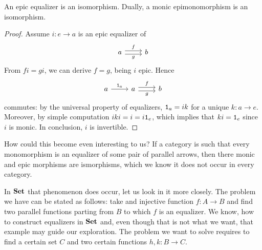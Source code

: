 \begin{proposition}\label{proposition:EpicEqualizersAreIsomorphisms}
An epic equalizer is an isomorphism. Dually, a monic epimonomorphism is an isomorphism.
\end{proposition}

\begin{proof}
Assume \(i : e \to a\) is an epic equalizer of
\[\begin{tikzcd} a \ar["f", r, shift left] \ar["g", r, shift right, swap] & b \end{tikzcd}\] From \(fi = gi\), we can derive \(f = g\), being \(i\) epic. Hence
\[\begin{tikzcd} a \ar["{\id_a}", r] & a \ar["f", r, shift left] \ar["g", r, shift right, swap] & b \end{tikzcd}\]
commutes: by the universal property of equalizers, \(\mathtt 1_a = ik\) for a unique \(k : a \to e\). Moreover, by simple computation \(iki = i = i \mathtt 1_e\), which implies that \(ki = \mathtt 1_e\) since \(i\) is monic. In conclusion, \(i\) is invertible.
\end{proof}

How could this become even interesting to us? If a category is such that every monomorphism is an equalizer of some pair of parallel arrows, then there monic and epic morphisms are ismorphisms, which we know it does not occur in every category.

\begin{example}
In \(\mathbf{Set}\) that phenomenon does occur, let us look in it more closely. The problem we have can be stated as follows: take and injective function \(f : A \to B\) and find two parallel functions parting from \(B\) to which \(f\) is an equalizer. We know, how to construct equalizers in \(\mathbf{Set}\) and, even though that is not what we want, that example may guide our exploration. The problem we want to solve requires to find a certain set \(C\) and two certain functions \(h, k : B \to C\). \YetToBeTeXed{}
\end{example}

